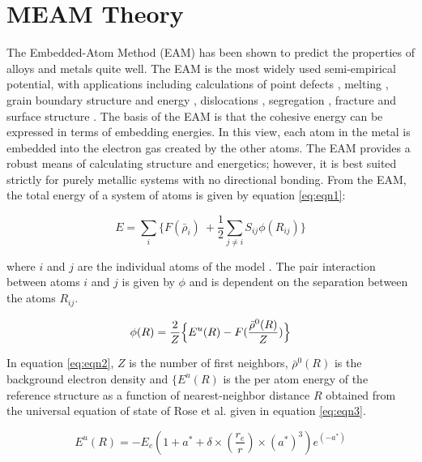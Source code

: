 \documentclass[review]{elsarticle}
\begin{document}
 
\section{MEAM Theory}
The Embedded-Atom Method (EAM) \cite{daw1984, daw1993, daw1983} has been shown to predict the properties of alloys and metals quite well. The EAM is the most widely used semi-empirical potential, with applications including calculations of point defects \cite{olsson2009}, melting \cite{belaschenko2011}, grain boundary structure and energy \cite{liu1999}, dislocations \cite{chassange2011}, segregation \cite{li2009MatChem}, fracture \cite{vatne2011} and surface structure \cite{rose1984}.  The basis of the EAM is that the cohesive energy can be expressed in terms of embedding energies.  In this view, each atom in the metal is embedded into the electron gas created by the other atoms.  The EAM provides a robust means of calculating structure and energetics; however, it is best suited strictly for purely metallic systems with no directional bonding.
From the EAM, the total energy of a system of atoms is given by equation \ref{eq:eqn1}:


\begin{equation}
\label{eq:eqn1}
E = \sum_{i} \{F(\bar{\rho}_{i})\ +  \frac{1}{2} \sum_{j \neq i} S_{ij}\phi(R_{ij})   \}
\end{equation}

where $i$ and $j$ are the individual atoms of the model \cite{daw1983, daw1984}.  The pair interaction between atoms $i$ and $j$ is given by $\phi$ \cite{baskes1992} and is dependent on the separation between the atoms $R_{ij}$.

\begin{equation}
\label{eq:eqn2}
\phi(R) = \frac{2}{Z} \Bigl\{ E^{u}(R) - F( \frac{ \bar{ \rho}^{0}(R)}{Z}) \Bigr\}  
\end{equation}

In equation \ref{eq:eqn2}, $Z$ is the number of first neighbors, $\bar{ \rho}^{0}(R)$ is the background electron density and $\{E^{u}(R)$ is the per atom energy of the reference structure as a function of nearest-neighbor distance $R$ \cite{baskes2000} obtained from the universal equation of state of Rose et al. \cite{rose1984} given in equation \ref{eq:eqn3}.

\begin{equation}
\label{eq:eqn3}
 E^{u}(R) = -E_{c} (1 + a^{*} + \delta \times (\frac{r_{e}}{r}) \times (a^{*})^{3}) e^{(-a^{*})}
 \end{equation}
\end{document}
